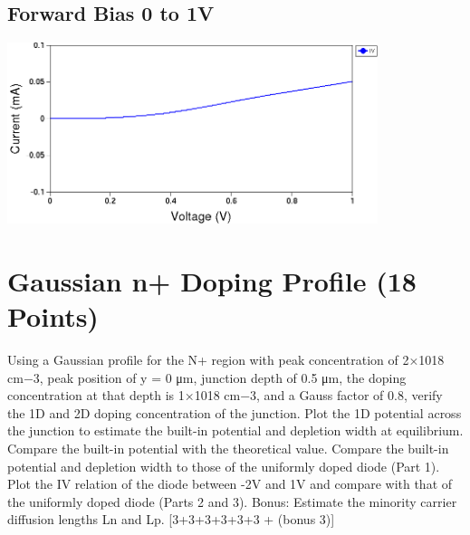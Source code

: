\documentclass[12pt]{article}
\begin{document}
\subsection{Forward Bias 0 to 1V}
\includegraphics[width=\textwidth, height=200px]{4b.png}

\section{Gaussian n+ Doping Profile (18 Points)}
Using a Gaussian profile for the N+ region with peak concentration of 2×1018 cm−3, peak position of y = 0 μm, junction depth of 0.5 μm, the doping concentration at that depth is 1×1018 cm−3, and a Gauss factor of 0.8, verify the 1D and 2D doping concentration of the junction. Plot the 1D potential across the junction to estimate the built-in potential and depletion width at equilibrium. Compare the built-in potential with the theoretical value. Compare the built-in potential and depletion width to those of the uniformly doped diode (Part 1). Plot the IV relation of the diode between -2V and 1V and compare with that of the uniformly doped diode (Parts 2 and 3). Bonus: Estimate the minority carrier diffusion lengths Ln and Lp. [3+3+3+3+3+3 + (bonus 3)]
\end{document}

